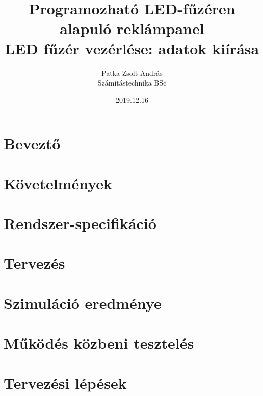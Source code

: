 \documentclass[12pt]{article}
\title{Programozható LED-fűzéren alapuló reklámpanel \\
	LED fűzér vezérlése: adatok kiírása}
\author{Patka Zsolt-András \\ Számítástechnika BSc}
\date{2019.12.16}
\begin{document}
\maketitle
{}

\newpage
\tableofcontents
\newpage

\section{Beveztő}


\section{Követelmények}


\section{Rendszer-specifikáció}


\section{Tervezés}


\section{Szimuláció eredménye}


\section{Működés közbeni tesztelés}


\newpage



\newpage
\appendix
\section{Tervezési lépések}

\end{document}
